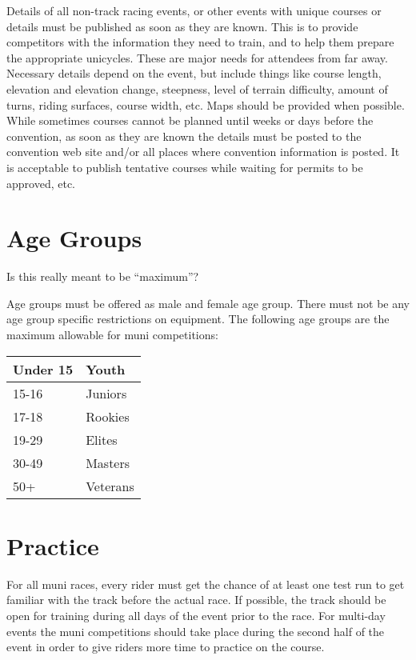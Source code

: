 Details of all non-track racing events, or other events with unique courses or details must be published as soon as they are known.
This is to provide competitors with the information they need to train, and to help them prepare the appropriate unicycles.
These are major needs for attendees from far away.
Necessary details depend on the event, but include things like course length, elevation and elevation change, steepness, level of terrain difficulty, amount of turns, riding surfaces, course width, etc.
Maps should be provided when possible.
While sometimes courses cannot be planned until weeks or days before the convention, as soon as they are known the details must be posted to the convention web site and/or all places where convention information is posted.
It is acceptable to publish tentative courses while waiting for permits to be approved, etc.

\section{Age Groups}

\begin{comment2016}%
Is this really meant to be ``maximum''?
\end{comment2016}

Age groups must be offered as male and female age group.
There must not be any age group specific restrictions on equipment.
The following age groups are the maximum allowable for muni competitions:

\begin{tabular}{|l|l|}
\hline
Under 15 & Youth \\
\hline
15-16 & Juniors \\
\hline
17-18 & Rookies \\
\hline
19-29 & Elites \\
\hline
30-49 & Masters \\
\hline
50+ & Veterans \\
\hline
\end{tabular}

\section{Practice}

For all muni races, every rider must get the chance of at least one test run to get familiar with the track before the actual race.
If possible, the track should be open for training during all days of the event prior to the race.
For multi-day events the muni competitions should take place during the second half of the event in order to give riders more time to practice on the course.

